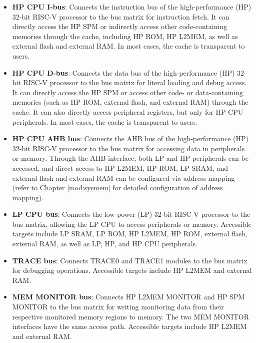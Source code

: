 \documentclass[main\_\_EN.tex]{subfiles}
\begin{document}
\begin{itemize}

    \item \textbf{HP CPU I-bus}: Connects the instruction bus of the high-performance (HP) 32-bit RISC-V processor to the bus matrix for instruction fetch. It can directly access the HP SPM or indirectly access other code-containing memories through the cache, including HP ROM, HP L2MEM, as well as external flash and external RAM. In most cases, the cache is transparent to users.

    \item \textbf{HP CPU D-bus}: Connects the data bus of the high-performance (HP) 32-bit RISC-V processor to the bus matrix for literal loading and debug access. It can directly access the HP SPM or access other code- or data-containing memories (such as HP ROM, external flash, and external RAM) through the cache. It can also directly access peripheral registers, but only for HP CPU peripherals. In most cases, the cache is transparent to users.

    \item \textbf{HP CPU AHB bus}: Connects the AHB bus of the high-performance (HP) 32-bit RISC-V processor to the bus matrix for accessing data in peripherals or memory. Through the AHB interface, both LP and HP peripherals can be accessed, and direct access to HP L2MEM, HP ROM, LP SRAM, and external flash and external RAM can be configured via address mapping (refer to Chapter \ref{mod:sysmem} \textit{} for detailed configuration of address mapping).

    \item \textbf{LP CPU bus}: Connects the low-power (LP) 32-bit RISC-V processor to the bus matrix, allowing the LP CPU to access peripherals or memory. Accessible targets include LP SRAM, LP ROM, HP L2MEM, HP ROM, external flash, external RAM, as well as LP, HP, and HP CPU peripherals.

    \item \textbf{TRACE bus}: Connects TRACE0 and TRACE1 modules to the bus matrix for debugging operations. Accessible targets include HP L2MEM and external RAM.

    \item \textbf{MEM MONITOR bus}: Connects HP L2MEM MONITOR and HP SPM MONITOR to the bus matrix for writing monitoring data from their respective monitored memory regions to memory. The two MEM MONITOR interfaces have the same access path. Accessible targets include HP L2MEM and external RAM.


\end{itemize}
\end{document}
